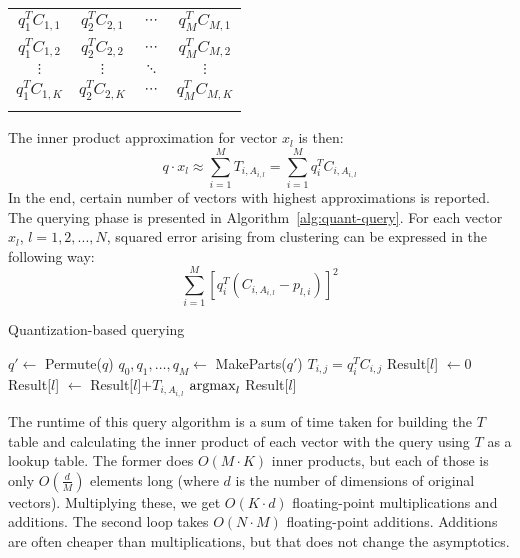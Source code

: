 \renewcommand{\arraystretch}{1.6}
\begin{center}
\begin{tabular}{|c|c|c|c|}
\hhline{----}
$ q_1^T C_{1,1} $ & $ q_2^T C_{2,1} $ & $ \cdots $ & $ q_M^T C_{M,1} $\\
\hhline{----}
$ q_1^T C_{1,2} $ & $ q_2^T C_{2,2} $ & $ \cdots $ & $ q_M^T C_{M,2} $\\
\hhline{----}
$ \vdots $ & $ \vdots $ & $ \ddots $ & $ \vdots $\\
\hhline{----}
$ q_1^T C_{1,K} $ & $ q_2^T C_{2,K} $ & $ \cdots $ & $ q_M^T C_{M,K} $\\
\hhline{----}
\end{tabular}
\end{center}

The inner product approximation for vector $x_l$ is then:
$$q \cdot x_l \approx \sum_{i=1}^{M} T_{i,A_{i,l}} = \sum_{i=1}^{M} q_i^T C_{i,A_{i,l}} $$
In the end, certain number of vectors with highest approximations is reported.
The querying phase is presented in Algorithm~\ref{alg:quant-query}.
For each vector $x_l$, $l = 1,2,...,N$, squared error arising from clustering can be expressed in the following way:
$$ \sum_{i=1}^{M}  [q_{i}^{T} (C_{i, A_{i,l}} - p_{l,i})]^2$$

\begin{algorithm}
	\caption{Quantization-based querying}
	\begin{algorithmic}
		\State $q' \gets$ Permute($q$)
		\State $q_0, q_1, \dots, q_M \gets$ MakeParts($q'$)
				\State $T_{i,j} = q_i^T C_{i,j}$
			\EndFor
		\EndFor
			\State Result[$l$] $\gets 0$
				\State Result[$l$] $\gets$ Result[$l$]$+ T_{i,A_{i,l}}$
			\EndFor
		\EndFor
		\State \Return $\operatorname*{argmax}_{l}$ Result[$l$]
	\end{algorithmic}
\label{alg:quant-query}
\end{algorithm}

The runtime of this query algorithm is a sum of time taken for building the $T$ table and calculating the inner product of each vector with the query using $T$ as a lookup table.
The former does $O(M \cdot K)$ inner products, but each of those is only $O(\frac{d}{M})$
elements long (where $d$ is the number of dimensions of original vectors). 
Multiplying these, we get $O(K \cdot d)$ floating-point multiplications and additions.
The second loop takes $O(N \cdot M)$ floating-point {additions}. Additions are often
cheaper than multiplications, but that does not change the asymptotics.

